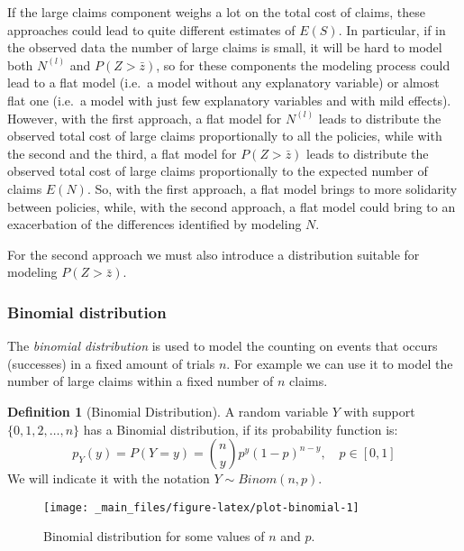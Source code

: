 \documentclass[a4paper, nobind]{templates/ociamthesis}
\theoremstyle{definition}
\newtheorem{definition}{Definition}[chapter]
\theoremstyle{definition}
\theoremstyle{definition}
\theoremstyle{remark}
\begin{document}
If the large claims component weighs a lot on the total cost of claims, these approaches could lead to quite different estimates of \(E(S)\). In particular, if in the observed data the number of large claims is small, it will be hard to model both \(N^{(l)}\) and \(P(Z>\bar{z})\), so for these components the modeling process could lead to a flat model (i.e.~a model without any explanatory variable) or almost flat one (i.e.~a model with just few explanatory variables and with mild effects). However, with the first approach, a flat model for \(N^{(l)}\) leads to distribute the observed total cost of large claims proportionally to all the policies, while with the second and the third, a flat model for \(P(Z>\bar{z})\) leads to distribute the observed total cost of large claims proportionally to the expected number of claims \(E(N)\). So, with the first approach, a flat model brings to more solidarity between policies, while, with the second approach, a flat model could bring to an exacerbation of the differences identified by modeling \(N\).

For the second approach we must also introduce a distribution suitable for modeling \(P(Z>\bar{z})\).

\hypertarget{binomial-distribution}{%
\subsubsection{Binomial distribution}\label{binomial-distribution}}

The \emph{binomial distribution} is used to model the counting on events that occurs (successes) in a fixed amount of trials \(n\). For example we can use it to model the number of large claims within a fixed number of \(n\) claims.

\begin{definition}[Binomial Distribution]
\label{def:def-binomial} \iffalse (Binomial Distribution) \fi{} A random variable \(Y\) with support \(\{0,1,2, \dots, n \}\) has a Binomial distribution, if its probability function is:
\[
p_Y(y) = P\left( Y = y \right) = \binom{n}{y} p^y (1-p)^{n-y}, \quad p \in [0, 1]
\]
We will indicate it with the notation \(Y \sim Binom(n, p)\).
\end{definition}

\begin{figure}[!hbtp]

{\centering \texttt{[image: \_main\_files/figure-latex/plot-binomial-1]} 

}

\caption{Binomial distribution for some values of $n$ and $p$.}\label{fig:plot-binomial}
\end{figure}
\end{document}
